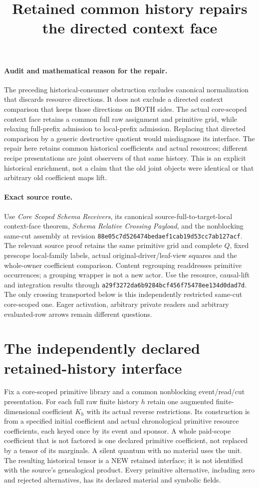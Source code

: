 \documentclass{article}
\title{Retained common history repairs the directed context face}
\author{}\date{}
\begin{document}
\maketitle
\paragraph{Audit and mathematical reason for the repair.}
The preceding historical-consumer obstruction excludes canonical normalization that discards resource directions. It does not exclude a directed context comparison that keeps those directions on BOTH sides. The actual core-scoped context face retains a common full raw assignment and primitive grid, while relaxing full-prefix admission to local-prefix admission. Replacing that directed comparison by a generic destructive quotient would misdiagnose its interface. The repair here retains common historical coefficients and actual resources; different recipe presentations are joint observers of that same history. This is an explicit historical enrichment, not a claim that the old joint objects were identical or that arbitrary old coefficient maps lift.

\paragraph{Exact source route.}
Use \emph{Core Scoped Schema Receivers}, its canonical source-full-to-target-local context-face theorem, \emph{Schema Relative Crossing Payload}, and the nonblocking same-cut assembly at revision \texttt{88e05c7d526474bedaef1cab19d53cc7ab127acf}. The relevant source proof retains the same primitive grid and complete $Q$, fixed prescope local-family labels, actual original-driver/leaf-view squares and the whole-owner coefficient comparison. Content regrouping readdresses primitive occurrences; a grouping wrapper is not a new actor. Use the resource, causal-lift and integration results through \texttt{a29f3272da6b9284bcf456f75478ee134d0dad7d}. The only crossing transported below is this independently restricted same-cut core-scoped one. Eager activation, arbitrary private readers and arbitrary evaluated-row arrows remain different questions.

\section{The independently declared retained-history interface}
Fix a core-scoped primitive library and a common nonblocking event/read/cut presentation. For each full raw finite history $h$ retain one augmented finite-dimensional coefficient $K_h$ with its actual reverse restrictions. Its construction is from a specified initial coefficient and actual chronological primitive resource coefficients, each keyed once by its event and sponsor. A whole paid-scope coefficient that is not factored is one declared primitive coefficient, not replaced by a tensor of its marginals. A silent quantum with no material uses the unit. The resulting historical tensor is a NEW retained interface; it is not identified with the source's genealogical product. Every primitive alternative, including zero and rejected alternatives, has its declared material and symbolic fields.
\end{document}
